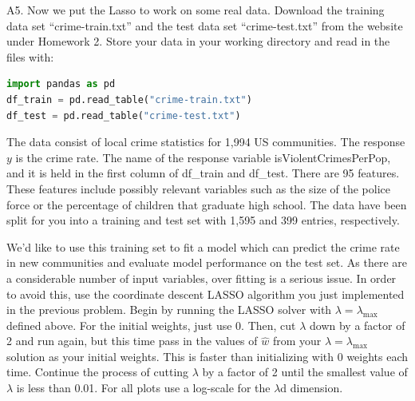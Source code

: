 \documentclass{article}
\newcommand{\1}{\mathbf{1}}
\begin{document}
\newpage
A5. Now we put the Lasso to work on some real data.  Download the training data set “crime-train.txt” and the test data set “crime-test.txt” from the website under Homework 2.  Store your data in your working directory and read in the files with:
\begin{lstlisting}[language=Python]
import pandas as pd
df_train = pd.read_table("crime-train.txt")
df_test = pd.read_table("crime-test.txt")
\end{lstlisting}

The data consist of local crime statistics for 1,994 US communities. The response $y$ is the crime rate. The name of the response variable isViolentCrimesPerPop, and it is held in the first column of df\_train and df\_test. There are 95 features.  These features include possibly relevant variables such as the size of the police force or the percentage of children that graduate high school. The data have been split for you into a training and test set with 1,595 and 399 entries, respectively.

We’d like to use this training set to fit a model which can predict the crime rate in new communities and evaluate model performance on the test set. As there are a considerable number of input variables, over fitting is a serious issue. In order to avoid this, use the coordinate descent LASSO algorithm you just implemented in the previous problem. Begin by running the LASSO solver with $\lambda = \lambda_{\max}$ defined above. For the initial weights, just use 0. Then, cut $\lambda$ down by a factor of 2 and run again, but this time pass in the values of $\widehat w$ from your $\lambda = \lambda_{\max}$ solution as your initial weights. This is faster than initializing with 0 weights each time. Continue the process of cutting $\lambda$ by a factor of 2 until the smallest value of $\lambda$ is less than 0.01. For all plots use a log-scale for the $\lambda$d dimension.
\end{document}
